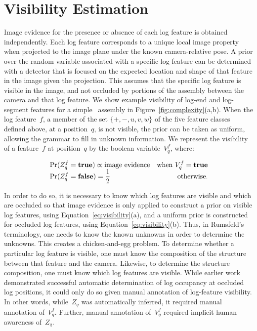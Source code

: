 \par\vspace{-1ex}
\section{Visibility Estimation}
\label{sec:visibility}

Image evidence for the presence or absence of each log feature is obtained
independently.
%
Each log feature corresponds to a unique local image property when projected to
the image plane under the known camera-relative pose.
%
A prior over the random variable associated with a specific log feature can be
determined with a detector that is focused on the expected location and shape
of that feature in the image given the projection.
%
This assumes that the specific log feature is visible in the image, and not
occluded by portions of the assembly between the camera and that log feature.
%
We show example visibility of log-end and log-segment features for a simple
\LincolnLog\ assembly in Figure~\ref{fig:complexity}(a,b).
%
When the log feature~$f$, a member of the set $\{+,-,u,v,w\}$ of the five
feature classes defined above, at a position~$q$, is not visible, the prior can
be taken as uniform, allowing the grammar to fill in unknown information.
%
We represent the visibility of a feature~$f$ at position~$q$ by the boolean
variable~$V^f_q$, where:

\par\vspace*{-4ex}
\begin{subequations}
  \begin{align}
    &\Pr(Z^f_q=\true)\propto\text{image evidence}&\text{when $V^f_q=\true$}\\[-1ex]
    &\Pr(Z^f_q=\false)=\frac{1}{2}&\text{otherwise.}
  \end{align}
  \label{eq:visibility}
  \vspace*{-2ex}
\end{subequations}

\par\vspace*{-1ex}\noindent
In order to do so, it is necessary to know which log features are visible and
which are occluded so that image evidence is only applied to construct a prior
on visible log features, using Equation~\ref{eq:visibility}(a), and a uniform
prior is constructed for occluded log features, using
Equation~\ref{eq:visibility}(b).
%
Thus, in Rumsfeld's terminology, one needs to know the known unknowns in order
to determine the unknowns.
%
This creates a chicken-and-egg problem.
%
To determine whether a particular log feature is visible, one must know the
composition of the structure between that feature and the camera.
%
Likewise, to determine the structure composition, one must know which log
features are visible.
%
While earlier work \cite{Siddharth2011} demonstrated successful automatic
determination of log occupancy at occluded log positions, it could only do so
given manual annotation of log-feature visibility.
%
In other words, while~$Z_q$ was automatically inferred, it required manual
annotation of~$V^f_q$.
%
Further, manual annotation of~$V^f_q$ required implicit human awareness
of~$Z_q$.


